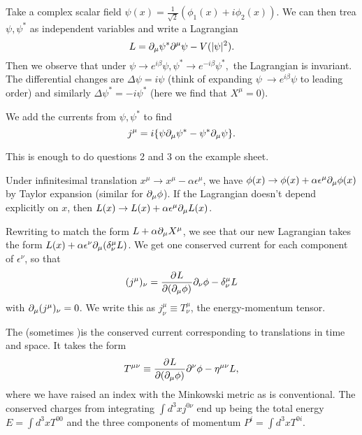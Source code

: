 \begin{exm}
Take a complex scalar field $\psi(x)=\frac{1}{\sqrt{2}}(\phi_1(x)+i\phi_2(x)).$ We can then trea $\psi, \psi^*$ as independent variables and write a Lagrangian
$$L=\partial_\mu \psi^* \partial^\mu \psi - V(|\psi|^2).$$
Then we observe that under $\psi\to e^{i\beta}\psi, \psi^* \to e^{-i\beta}\psi^*,$ the Lagrangian is invariant. The differential changes are $\Delta \psi = i \psi$ (think of expanding $\psi\ \to e^{i\beta}\psi$ to leading order) and similarly $\Delta \psi^*=-i\psi^*$ (here we find that $X^\mu=0$).

We add the currents from $\psi, \psi^*$ to find
$$j^\mu = i\{ \psi \partial_\mu \psi^* - \psi^* \partial_\mu \psi\}.$$
\end{exm}
This is enough to do questions 2 and 3 on the example sheet.
\begin{exm}
Under infinitesimal translation $x^\mu \to x^\mu -\alpha \epsilon^\mu$, we have $\phi(x)\to \phi(x)+\alpha \epsilon^\mu \partial_\mu \phi(x)$ by Taylor expansion (similar for $\partial_\mu\phi$). If the Lagrangian doesn't depend explicitly on $x$, then $L(x)\to L(x) +\alpha \epsilon^\mu \partial_\mu L(x)$.

Rewriting to match the form $L+\alpha \partial_\mu X^\mu$, we see that our new Lagrangian takes the form
$L(x)+\alpha \epsilon^\nu \partial_\mu (\delta^\mu_\nu L)$. We get one conserved current for each component of $\epsilon^\nu$, so that
$$(j^\mu)_\nu = \frac{\partial^{} L}{\partial (\partial_\mu \phi) ^{}}\partial_\nu \phi - \delta^\mu_\nu L$$ with $\partial_\mu(j^\mu)_\nu=0$.
We write this as $j^\mu_\nu \equiv T^\mu_\nu$, the energy-momentum tensor. 

\begin{defn}
The  (sometimes )is the conserved current corresponding to translations in time and space. It takes the form 
$$T^{\mu\nu} \equiv \frac{\partial^{} L}{\partial (\partial_\mu \phi) ^{}}\partial^\nu \phi - \eta^{\mu\nu} L,$$
where we have raised an index with the Minkowski metric as is conventional. The conserved charges from integrating $\int d^3x j^{0\nu}$ end up being the total energy $E=\int d^3x T^{00}$ and the three components of momentum $P^i=\int d^3x T^{0i}$.
\end{defn}
\end{exm}